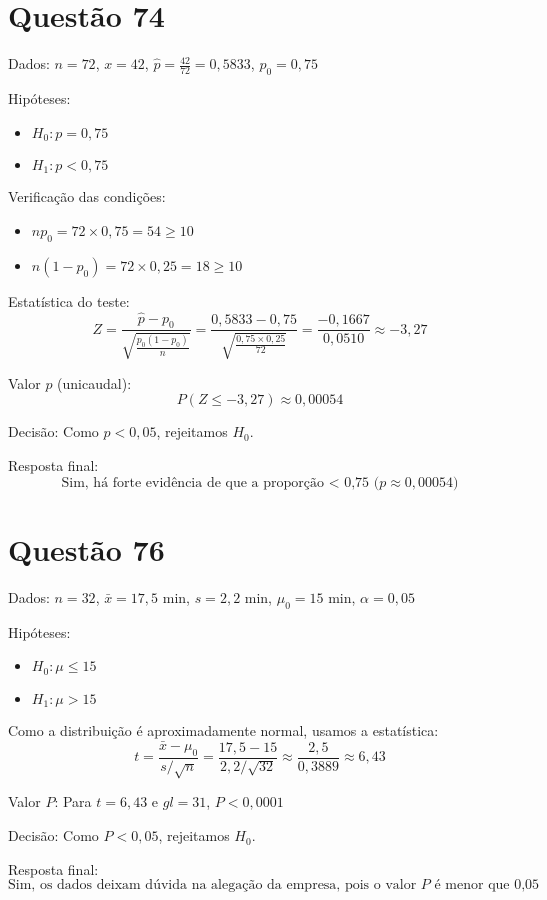 \documentclass[12pt]{article}
\newcommand{\quest}[1]{\section*{Questão #1}} %
\begin{document}
\quest{74}

Dados: $n = 72$, $x = 42$, $\hat{p} = \frac{42}{72} = 0{,}5833$, $p_0 = 0{,}75$

Hipóteses:
\begin{itemize}
  \item $H_0: p = 0{,}75$
  \item $H_1: p < 0{,}75$
\end{itemize}

Verificação das condições:
\begin{itemize}
  \item $np_0 = 72 \times 0{,}75 = 54 \geq 10$
  \item $n(1 - p_0) = 72 \times 0{,}25 = 18 \geq 10$
\end{itemize}

Estatística do teste:
\[
Z = \frac{\hat{p} - p_0}{\sqrt{\frac{p_0(1 - p_0)}{n}}} = \frac{0{,}5833 - 0{,}75}{\sqrt{\frac{0{,}75 \times 0{,}25}{72}}} = \frac{-0{,}1667}{0{,}0510} \approx -3{,}27
\]

Valor $p$ (unicaudal):
\[
P(Z \leq -3{,}27) \approx 0{,}00054
\]

Decisão: Como $p < 0{,}05$, rejeitamos $H_0$.

Resposta final:
\[
\boxed{\text{Sim, h\'a forte evid\^encia de que a propor\c{c}\~ao < 0{,}75 ($p \approx 0{,}00054$)}}
\]

\quest{76}

Dados: $n = 32$, $\bar{x} = 17{,}5$ min, $s = 2{,}2$ min, $\mu_0 = 15$ min, $\alpha = 0{,}05$

Hip\'oteses:
\begin{itemize}
  \item $H_0: \mu \leq 15$
  \item $H_1: \mu > 15$
\end{itemize}

Como a distribui\c{c}\~ao \'{e} aproximadamente normal, usamos a estat\'istica:
\[
t = \frac{\bar{x} - \mu_0}{s / \sqrt{n}} = \frac{17{,}5 - 15}{2{,}2 / \sqrt{32}} \approx \frac{2{,}5}{0{,}3889} \approx 6{,}43
\]

Valor $P$: Para $t = 6{,}43$ e $gl = 31$, $P < 0{,}0001$

Decis\~ao: Como $P < 0{,}05$, rejeitamos $H_0$.

Resposta final:
\[
\boxed{\text{Sim, os dados deixam d\'uvida na alega\c{c}\~ao da empresa, pois o valor $P$ \'{e} menor que 0{,}05}}
\]
\end{document}
